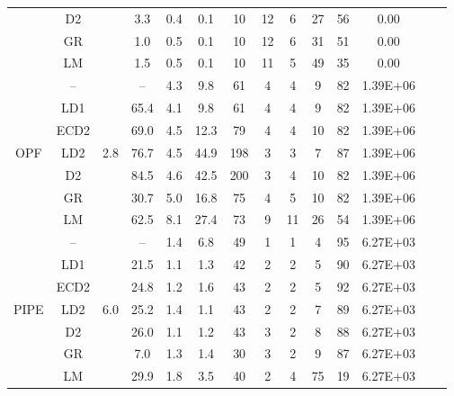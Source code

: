 \documentclass[smallextended]{svjour3}
\begin{document}
\begin{table}
{\begin{tabular}{cccccccccccccc}
                      & D2        &                      &   3.3 &   0.4 &   0.1 &  10 &  12 &   6 &  27 &  56 & 0.00\\
                      & GR        &                      &   1.0 &   0.5 &   0.1 &  10 &  12 &   6 &  31 &  51 & 0.00\\
                      & LM        &                      &   1.5 &   0.5 &   0.1 &  10 &  11 &   5 &  49 &  35 & 0.00\\
\midrule                                                                                                                      
\multirow{7}{*}{OPF}  & --        & \multirow{7}{*}{2.8} &    -- &   4.3 &   9.8 &  61 &   4 &   4 &   9 &  82 & 1.39E+06\\
                      & LD1       &                      &  65.4 &   4.1 &   9.8 &  61 &   4 &   4 &   9 &  82 & 1.39E+06\\
                      & ECD2      &                      &  69.0 &   4.5 &  12.3 &  79 &   4 &   4 &  10 &  82 & 1.39E+06\\
                      & LD2       &                      &  76.7 &   4.5 &  44.9 & 198 &   3 &   3 &   7 &  87 & 1.39E+06\\
                      & D2        &                      &  84.5 &   4.6 &  42.5 & 200 &   3 &   4 &  10 &  82 & 1.39E+06\\
                      & GR        &                      &  30.7 &   5.0 &  16.8 &  75 &   4 &   5 &  10 &  82 & 1.39E+06\\
                      & LM        &                      &  62.5 &   8.1 &  27.4 &  73 &   9 &  11 &  26 &  54 & 1.39E+06\\
\midrule                                                                                                                      
\multirow{7}{*}{PIPE} & --        & \multirow{8}{*}{6.0} &    -- &   1.4 &   6.8 &  49 &   1 &   1 &   4 &  95 & 6.27E+03\\
                      & LD1       &                      &  21.5 &   1.1 &   1.3 &  42 &   2 &   2 &   5 &  90 & 6.27E+03\\
                      & ECD2      &                      &  24.8 &   1.2 &   1.6 &  43 &   2 &   2 &   5 &  92 & 6.27E+03\\
                      & LD2       &                      &  25.2 &   1.4 &   1.1 &  43 &   2 &   2 &   7 &  89 & 6.27E+03\\
                      & D2        &                      &  26.0 &   1.1 &   1.2 &  43 &   3 &   2 &   8 &  88 & 6.27E+03\\
                      & GR        &                      &   7.0 &   1.3 &   1.4 &  30 &   3 &   2 &   9 &  87 & 6.27E+03\\
                      & LM        &                      &  29.9 &   1.8 &   3.5 &  40 &   2 &   4 &  75 &  19 & 6.27E+03\\
\bottomrule
  \end{tabular}
}
  \label{tab:solvetime}
\end{table}
\end{document}

